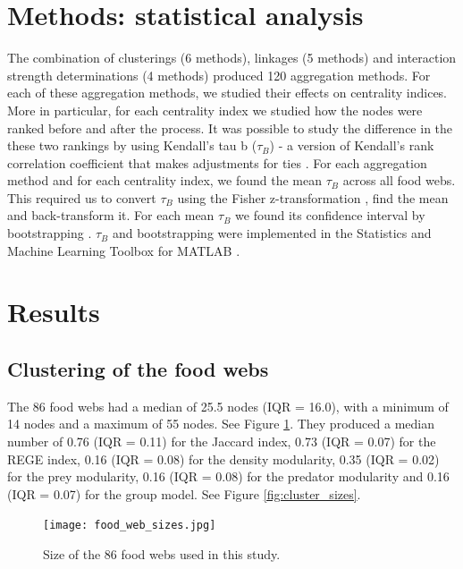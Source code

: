\documentclass[twocolumn]{article}
\begin{document}
\section*{Methods: statistical analysis}

	The combination of clusterings (6 methods), linkages (5 methods) and interaction strength determinations (4 methods) produced 120 aggregation methods. For each of these aggregation methods, we studied their effects on centrality indices. More in particular, for each centrality index we studied how the nodes were ranked before and after the process. It was possible to study the difference in the these two rankings by using Kendall's tau b ($\tau_B$) - a version of Kendall's rank correlation coefficient that makes adjustments for ties \citep{Agresti2012}. For each aggregation method and for each centrality index, we found the mean $\tau_B$ across all food webs. This required us to convert $\tau_B$ using the Fisher z-transformation \citep{Fisher1915}, find the mean and back-transform it. For each mean $\tau_B$ we found its confidence interval by bootstrapping \citep{DiCiccio1996}. $\tau_B$ and bootstrapping were implemented in the Statistics and Machine Learning Toolbox for MATLAB \citep{MathworksInc.2019}.

\section*{Results}

	\subsection*{Clustering of the food webs}

		The 86 food webs had a median of 25.5 nodes (IQR = 16.0), with a minimum of 14 nodes and a maximum of 55 nodes. See Figure \ref{fig:food_web_sizes}. They produced a median number of 0.76 (IQR = 0.11) for the Jaccard index, 0.73 (IQR = 0.07) for the REGE index, 0.16 (IQR = 0.08) for the density modularity, 0.35 (IQR = 0.02) for the prey modularity, 0.16 (IQR = 0.08) for the predator modularity and 0.16 (IQR = 0.07) for the group model. See Figure \ref{fig:cluster_sizes}.

						\begin{figure}[htbp]%
								\centering
								\texttt{[image: food\_web\_sizes.jpg]}
								\caption{Size of the 86 food webs used in this study.}
								\label{fig:food_web_sizes}
						\end{figure}
\end{document}
